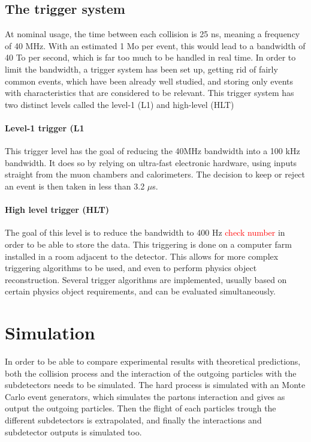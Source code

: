 \subsection{The trigger system}

At nominal usage, the time between each collision is 25 ns, meaning a frequency of 40 MHz. With an estimated 1 Mo per event, this would lead to a bandwidth of 40 To per second, which is far too much to be handled in real time. In order to limit the bandwidth, a trigger system has been set up, getting rid of fairly common events, which have been already well studied, and storing only events with characteristics that are considered to be relevant. This trigger system has two distinct levels called the level-1 (L1) and high-level (HLT)

\paragraph{Level-1 trigger (L1} This trigger level has the goal of reducing the 40MHz bandwidth into a 100 kHz bandwidth. It does so by relying on ultra-fast electronic hardware, using inputs straight from the muon chambers and calorimeters. The decision to keep or reject an event is then taken in less than 3.2 $\mu$s. 

\paragraph{High level trigger (HLT)} The goal of this level is to reduce the bandwidth to 400 Hz \textcolor{red}{check number} in order to be able to store the data. This triggering is done on a computer farm installed in a room adjacent to the detector. This allows for more complex triggering algorithms to be used, and even to perform physics object reconstruction. Several trigger algorithms are implemented, usually based on certain physics object requirements, and can be evaluated simultaneously.

\section{Simulation}

In order to be able to compare experimental results with theoretical predictions, both the collision process and the interaction of the outgoing particles with the subdetectors needs to be simulated. The hard process is simulated with an Monte Carlo event generators, which simulates the partons interaction and gives as output the outgoing particles. Then the flight of each particles trough the different subdetectors is extrapolated, and finally the interactions and subdetector outputs is simulated too.

